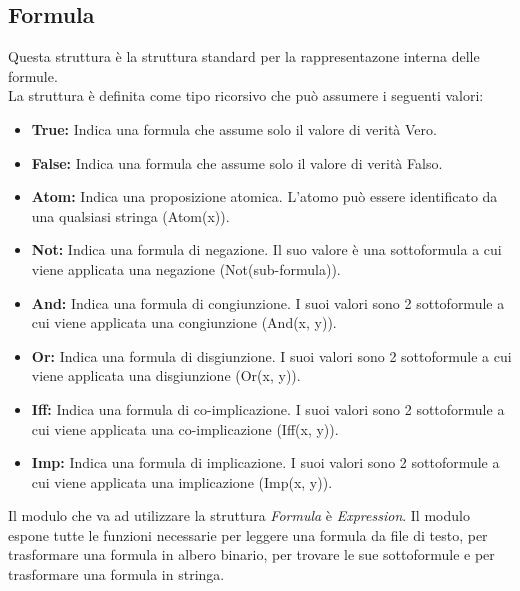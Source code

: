 \documentclass[\main/tesi.tex]{subfiles}
\begin{document}
\subsection{Formula}
Questa struttura è la struttura standard per la rappresentazone interna delle formule. \\
La struttura è definita come tipo ricorsivo che può assumere i seguenti valori:
\begin{itemize}
    \item \textbf{True:} Indica una formula che assume solo il valore di verità Vero.
    \item \textbf{False:} Indica una formula che assume solo il valore di verità Falso.
    \item \textbf{Atom:} Indica una proposizione atomica. L'atomo può essere identificato da una qualsiasi stringa (Atom(x)).
    \item \textbf{Not:} Indica una formula di negazione. Il suo valore è una sottoformula a cui viene applicata una negazione (Not(sub-formula)).
    \item \textbf{And:} Indica una formula di congiunzione. I suoi valori sono 2 sottoformule a cui viene applicata una congiunzione (And(x, y)).
    \item \textbf{Or:} Indica una formula di disgiunzione. I suoi valori sono 2 sottoformule a cui viene applicata una disgiunzione (Or(x, y)).
    \item \textbf{Iff:} Indica una formula di co-implicazione. I suoi valori sono 2 sottoformule a cui viene applicata una co-implicazione (Iff(x, y)).
    \item \textbf{Imp:} Indica una formula di implicazione. I suoi valori sono 2 sottoformule a cui viene applicata una implicazione (Imp(x, y)).
\end{itemize}
Il modulo che va ad utilizzare la struttura \textit{Formula} è \textit{Expression}. Il modulo espone tutte le funzioni necessarie per leggere una formula da file di testo, per trasformare una formula in albero binario, per trovare le sue sottoformule e per trasformare una formula in stringa.
\end{document}
